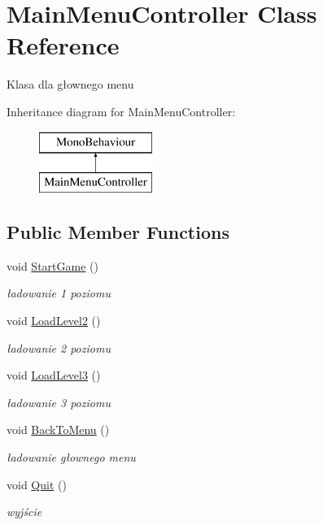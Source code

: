 \hypertarget{class_main_menu_controller}{}\section{Main\+Menu\+Controller Class Reference}
\label{class_main_menu_controller}


Klasa dla głownego menu  


Inheritance diagram for Main\+Menu\+Controller\+:\begin{figure}[H]
\begin{center}
\leavevmode
\includegraphics[height=2.000000cm]{class_main_menu_controller}
\end{center}
\end{figure}
\subsection*{Public Member Functions}
\begin{DoxyCompactItemize}
\item 
void \hyperlink{class_main_menu_controller_af693059f9f9b501929d35b23257f83ea}{Start\+Game} ()
\begin{DoxyCompactList}\small\item\em ładowanie 1 poziomu \end{DoxyCompactList}\item 
void \hyperlink{class_main_menu_controller_ab3774378b6ddd60fde78ecc9c2a5958e}{Load\+Level2} ()
\begin{DoxyCompactList}\small\item\em ładowanie 2 poziomu \end{DoxyCompactList}\item 
void \hyperlink{class_main_menu_controller_ab959d2affba0cdffd2d4c5cafba361ea}{Load\+Level3} ()
\begin{DoxyCompactList}\small\item\em ładowanie 3 poziomu \end{DoxyCompactList}\item 
void \hyperlink{class_main_menu_controller_ae7d63563e9950801e6b4e21250d723f6}{Back\+To\+Menu} ()
\begin{DoxyCompactList}\small\item\em ładowanie głownego menu \end{DoxyCompactList}\item 
void \hyperlink{class_main_menu_controller_ad03fe2e1403dbc61cbc2838abd0091f4}{Quit} ()
\begin{DoxyCompactList}\small\item\em wyjście \end{DoxyCompactList}\end{DoxyCompactItemize}



